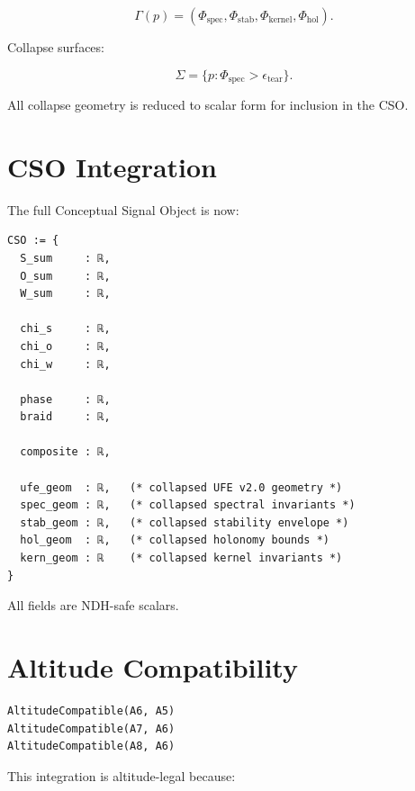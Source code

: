 \documentclass[11pt]{article}
\begin{document}
\[
\Gamma(p) = ( \Phi_{\mathrm{spec}}, \Phi_{\mathrm{stab}},
              \Phi_{\mathrm{kernel}}, \Phi_{\mathrm{hol}} ).
\]

Collapse surfaces:

\[
\Sigma = \{ p : \Phi_{\mathrm{spec}} > \epsilon_{\mathrm{tear}} \}.
\]

All collapse geometry is reduced to scalar form for inclusion in the CSO.

\newpage


\section{CSO Integration}

The full Conceptual Signal Object is now:

\begin{verbatim}
CSO := {
  S_sum     : ℝ,
  O_sum     : ℝ,
  W_sum     : ℝ,

  chi_s     : ℝ,
  chi_o     : ℝ,
  chi_w     : ℝ,

  phase     : ℝ,
  braid     : ℝ,

  composite : ℝ,

  ufe_geom  : ℝ,   (* collapsed UFE v2.0 geometry *)
  spec_geom : ℝ,   (* collapsed spectral invariants *)
  stab_geom : ℝ,   (* collapsed stability envelope *)
  hol_geom  : ℝ,   (* collapsed holonomy bounds *)
  kern_geom : ℝ    (* collapsed kernel invariants *)
}
\end{verbatim}

All fields are NDH-safe scalars.

\newpage


\section{Altitude Compatibility}

\begin{verbatim}
AltitudeCompatible(A6, A5)
AltitudeCompatible(A7, A6)
AltitudeCompatible(A8, A6)
\end{verbatim}

This integration is altitude-legal because:
\end{document}
